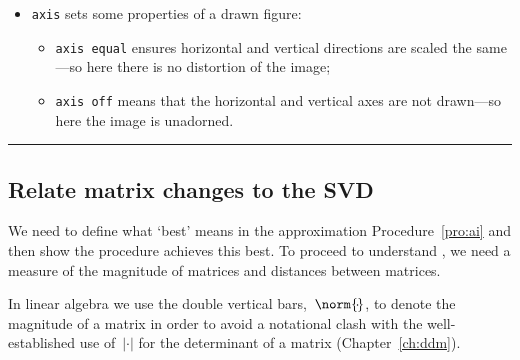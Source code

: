 \begin{table}
\begin{minipage}{\linewidth}
\begin{itemize}

\item {}\verb|axis| sets some properties of a drawn figure:
\begin{itemize}
\item \verb|axis equal| ensures horizontal and vertical directions are scaled the same---so here there is no distortion of the image;
\item \verb|axis off| means that the horizontal and vertical axes are not drawn---so here the image is unadorned.
\end{itemize}


\end{itemize}
\end{minipage}
\hrule
\end{table}








\subsection{Relate matrix changes to the SVD}
\label{sec:rmmsvd}


We need to define what `best' means in the approximation Procedure~\ref{pro:ai} and then show the procedure achieves this best.
To proceed to understand , we need a measure of the magnitude of matrices and distances between matrices.

In linear algebra we use the double vertical bars,~\(\norm{\cdot}\), to  denote the magnitude of a matrix in order to avoid a notational clash with the well-established use of~\(|\cdot|\) for the determinant of a matrix (Chapter~\ref{ch:ddm}).

